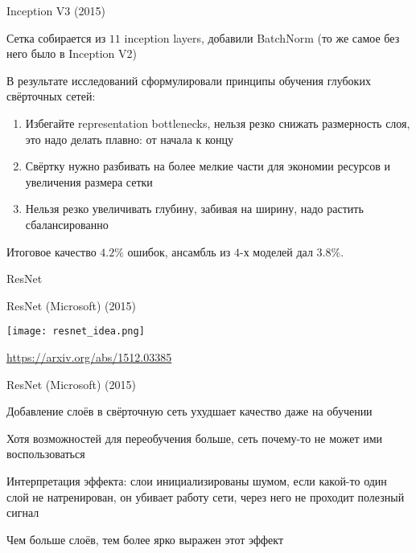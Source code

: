 \documentclass[notes,12pt, aspectratio=169]{beamer}
\newenvironment{transitionframe}{
  \setbeamercolor{background canvas}{bg=yellow}
  \begin{frame}}{
    \end{frame}
}
\newenvironment{wideitemize}{\itemize\addtolength{\itemsep}{10pt}}{\enditemize}
\begin{document}
\begin{frame}{Inception V3 (2015)}
\begin{wideitemize}
	\item  Сетка собирается из $11$ inception layers, добавили BatchNorm (то же самое без него было в Inception V2)
	
	\item В результате исследований сформулировали \alert{принципы обучения глубоких свёрточных сетей:}
	
	\begin{enumerate}
		\item  Избегайте representation bottlenecks, нельзя резко снижать размерность слоя, это надо делать плавно: от начала к концу
		\item Свёртку нужно разбивать на более мелкие части для экономии ресурсов и увеличения размера сетки 
		\item Нельзя резко увеличивать глубину, забивая на ширину, надо растить сбалансированно
	\end{enumerate} 

	\item Итоговое качество $4.2\%$ ошибок, ансамбль из $4$-х моделей дал $3.8\%$. 
\end{wideitemize}
\end{frame}


 \begin{transitionframe}
	\begin{center}
		\Huge  ResNet
	\end{center}
\end{transitionframe}



\begin{frame}{ResNet (Microsoft) (2015)}
\begin{center}
	\texttt{[image: resnet\_idea.png]}
\end{center}
\vfill %
\footnotesize
\color{blue} \url{https://arxiv.org/abs/1512.03385}
\end{frame}


\begin{frame}{ResNet (Microsoft) (2015)}
\begin{wideitemize}
	\item  Добавление слоёв в свёрточную сеть ухудшает качество даже на обучении
	\item  Хотя возможностей для переобучения больше, сеть почему-то не может ими воспользоваться
	\item  \alert{Интерпретация эффекта:} слои инициализированы шумом, если какой-то один слой не натренирован, он убивает работу сети, через него не проходит полезный сигнал 
	\item Чем больше слоёв, тем более ярко выражен этот эффект 
\end{wideitemize}
\end{frame}
\end{document}
